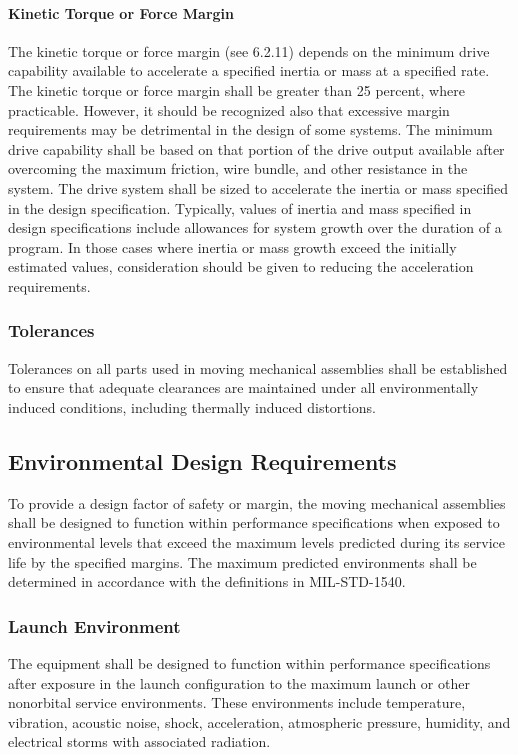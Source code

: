 \documentclass[12pt]{article}
\begin{document}
\paragraph{Kinetic Torque or Force Margin} %
The kinetic torque or force margin (see 6.2.11) depends on the minimum drive capability available to accelerate a specified inertia or mass at a specified rate. 
The kinetic torque or force margin shall be greater than 25 percent, where practicable. 
However, it should be recognized also that excessive margin requirements may be detrimental in the design of some systems. 
The minimum drive capability shall be based on that portion of the drive output available after overcoming the maximum friction, wire bundle, and other resistance in the system. 
The drive system shall be sized to accelerate the inertia or mass specified in the design specification. 
Typically, values of inertia and mass specified in design specifications include allowances for system growth over the duration of a program. 
In those cases where inertia or mass growth exceed the initially estimated values, consideration should be given to reducing the acceleration requirements.

\subsubsection{Tolerances} %
Tolerances on all parts used in moving mechanical assemblies shall be established to ensure that adequate clearances are maintained under all environmentally induced conditions, including thermally induced distortions.

\subsection{Environmental Design Requirements} %
To provide a design factor of safety or margin, the moving mechanical assemblies shall be designed to function within performance specifications when exposed to environmental levels that exceed the maximum levels predicted during its service life by the specified margins. 
The maximum predicted environments shall be determined in accordance with the definitions in MIL-STD-1540.

\subsubsection{Launch Environment} %
The equipment shall be designed to function within performance specifications after exposure in the launch configuration to the maximum launch or other nonorbital service environments. 
These environments include temperature, vibration, acoustic noise, shock, acceleration, atmospheric pressure, humidity, and electrical storms with associated radiation.
\end{document}
